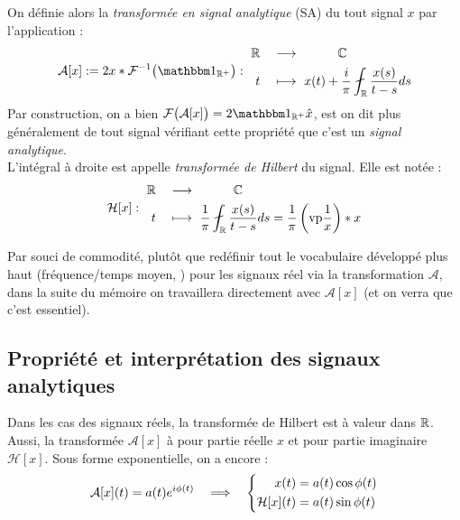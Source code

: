 \begin{definition}
	On définie alors la \emph{transformée en signal analytique} (SA) du tout signal $x$ par l'application :
	\begin{equation}\label{eq:transfo_SA}
		\mathcal{A}[x] \defeq 2 x*\mathcal{F}^{-1}\big(\one_{\R^+}\big) :\ \begin{aligned} 
			\R \quad &\lr\qquad\quad \C \\	
			t\quad &\longmapsto\ x(t) + \frac{i}{\pi}\fint_\R \frac{x(s)}{t-s}ds
		\end{aligned}
	\end{equation}
	Par construction, on a bien $\mathcal{F}\big(\mathcal{A}[x]\big) = 2\one_{\R^+}\hat{x}$, est on dit plus généralement de tout signal vérifiant cette propriété que c'est un \emph{signal analytique}.
	\\
	L'intégral à droite est appelle \emph{transformée de Hilbert} du signal. Elle est notée :
	\begin{equation}\label{eq:transfo_Hilb}
		\mathcal{H}[x] :\ \begin{aligned} 
			\R \quad &\lr\qquad\quad \C \\	
			t\quad &\longmapsto\ \frac{1}{\pi}\fint_\R \frac{x(s)}{t-s}ds =  \frac{1}{\pi}\left(\text{vp}\frac{1}{x}\right)*x
		\end{aligned}
	\end{equation}
\end{definition}

Par souci de commodité, plutôt que redéfinir tout le vocabulaire développé plus haut (fréquence/temps moyen, \etc) pour les signaux réel via la transformation $\mathcal{A}$, dans la suite du mémoire on travaillera directement avec $\mathcal{A}[x]$ (et on verra que c'est essentiel).




\subsection{Propriété et interprétation des signaux analytiques}


Dans les cas des signaux réels, la transformée de Hilbert est à valeur dans $\mathbb{R}$. Aussi, la transformée $\mathcal{A}[x]$ à pour partie réelle $x$ et pour partie imaginaire $\mathcal{H}[x]$. Sous forme exponentielle, on a encore :
\[\mathcal{A}[x](t) = a(t)e^{i\phi(t)}\quad \Longrightarrow\quad \left\{\begin{aligned}x(t) &= a(t) \cos\phi(t) \\\mathcal{H}[x](t) &= a(t) \sin\phi(t)
\end{aligned}\right.\]
\\

